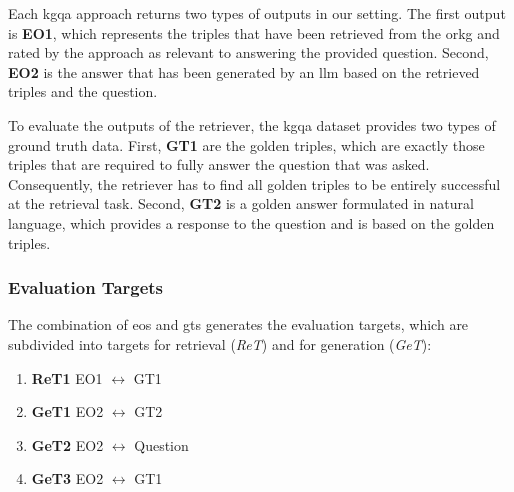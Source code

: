 Each \gls{kgqa} approach returns two types of outputs in our setting. The first output is \textbf{EO1}, which represents the triples that have been retrieved from the \gls{orkg} and rated by the approach as relevant to answering the provided question. Second, \textbf{EO2} is the answer that has been generated by an \gls{llm} based on the retrieved triples and the question.

To evaluate the outputs of the retriever, the \gls{kgqa} dataset provides two types of ground truth data. First, \textbf{GT1} are the golden triples, which are exactly those triples that are required to fully answer the question that was asked. Consequently, the retriever has to find all golden triples to be entirely successful at the retrieval task. Second, \textbf{GT2} is a golden answer formulated in natural language, which provides a response to the question and is based on the golden triples. 

\subsubsection{Evaluation Targets}
The combination of \glspl{eo} and \glspl{gt} generates the evaluation targets, which are subdivided into targets for retrieval (\emph{ReT}) and for generation (\emph{GeT}):

\begin{enumerate}[label={}]
    \item \textbf{ReT1}\label{enum:ret1} EO1 \(\leftrightarrow \) GT1
    \item \textbf{GeT1}\label{enum:get3} EO2 \(\leftrightarrow \) GT2
    \item \textbf{GeT2} \label{enum:get1} EO2 \(\leftrightarrow \) Question
    \item \textbf{GeT3} \label{enum:get2} EO2 \(\leftrightarrow \) GT1
\end{enumerate}

